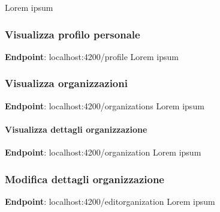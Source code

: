 \documentclass[../manuale-utente.tex]{subfiles}
\begin{document}
Lorem ipsum


\subsubsection{Visualizza profilo personale}%
\label{subs:visualizza-profilo-personale}


\textbf{Endpoint}: localhost:4200/profile
Lorem ipsum

\subsubsection{Visualizza organizzazioni}%
\label{subs:visualizza-organizzazioni}


\textbf{Endpoint}: localhost:4200/organizations
Lorem ipsum

\paragraph{Visualizza dettagli organizzazione}%
\label{par:visualizza-dettagli-organizzazione}


\textbf{Endpoint}: localhost:4200/organization
Lorem ipsum



\subsubsection{Modifica dettagli organizzazione}%
\label{subs:modififica-dettagli-organizzazione}


\textbf{Endpoint}: localhost:4200/editorganization
Lorem ipsum

\end{document}
